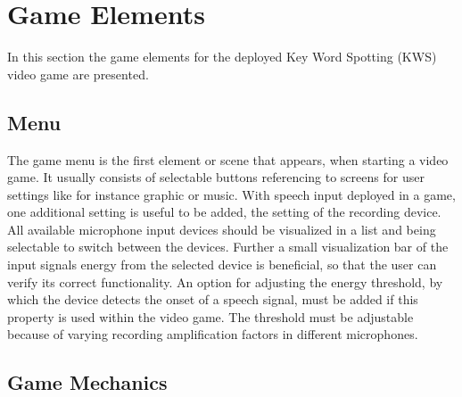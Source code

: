 
\section{Game Elements}
\thesisStateNotReady
In this section the game elements for the deployed Key Word Spotting (KWS) video game are presented.



\subsection{Menu}\label{sec:game_interactables_menu}
The game menu is the first element or scene that appears, when starting a video game. 
It usually consists of selectable buttons referencing to screens for user settings like for instance graphic or music.
With speech input deployed in a game, one additional setting is useful to be added, the setting of the recording device.
All available microphone input devices should be visualized in a list and being selectable to switch between the devices.
Further a small visualization bar of the input signals energy from the selected device is beneficial, so that the user can verify its correct functionality.
An option for adjusting the energy threshold, by which the device detects the onset of a speech signal, must be added if this property is used within the video game.
The threshold must be adjustable because of varying recording amplification factors in different microphones.



\subsection{Game Mechanics}
\thesisStateNotReady

